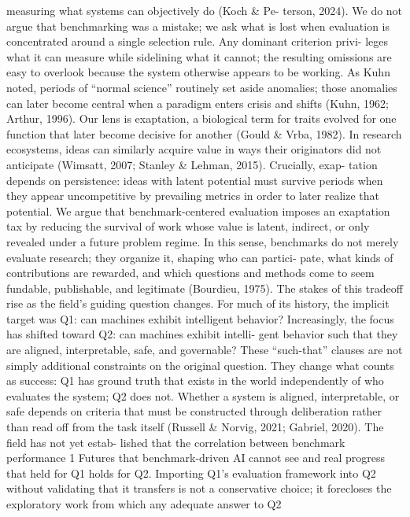 measuring what systems can objectively do (Koch \& Pe-
terson, 2024). We do not argue that benchmarking was a
mistake; we ask what is lost when evaluation is concentrated
around a single selection rule. Any dominant criterion privi-
leges what it can measure while sidelining what it cannot;
the resulting omissions are easy to overlook because the
system otherwise appears to be working. As Kuhn noted,
periods of “normal science” routinely set aside anomalies;
those anomalies can later become central when a paradigm
enters crisis and shifts (Kuhn, 1962; Arthur, 1996).
Our lens is exaptation, a biological term for traits evolved for
one function that later become decisive for another (Gould
\& Vrba, 1982). In research ecosystems, ideas can similarly
acquire value in ways their originators did not anticipate
(Wimsatt, 2007; Stanley \& Lehman, 2015). Crucially, exap-
tation depends on persistence: ideas with latent potential
must survive periods when they appear uncompetitive by
prevailing metrics in order to later realize that potential. We
argue that benchmark-centered evaluation imposes an
exaptation tax by reducing the survival of work whose
value is latent, indirect, or only revealed under a future
problem regime. In this sense, benchmarks do not merely
evaluate research; they organize it, shaping who can partici-
pate, what kinds of contributions are rewarded, and which
questions and methods come to seem fundable, publishable,
and legitimate (Bourdieu, 1975).
The stakes of this tradeoff rise as the field’s guiding question
changes. For much of its history, the implicit target was Q1:
can machines exhibit intelligent behavior? Increasingly, the
focus has shifted toward Q2: can machines exhibit intelli-
gent behavior such that they are aligned, interpretable, safe,
and governable? These “such-that” clauses are not simply
additional constraints on the original question. They change
what counts as success: Q1 has ground truth that exists in
the world independently of who evaluates the system; Q2
does not. Whether a system is aligned, interpretable, or
safe depends on criteria that must be constructed through
deliberation rather than read off from the task itself (Russell
\& Norvig, 2021; Gabriel, 2020). The field has not yet estab-
lished that the correlation between benchmark performance
1
Futures that benchmark-driven AI cannot see
and real progress that held for Q1 holds for Q2. Importing
Q1’s evaluation framework into Q2 without validating that
it transfers is not a conservative choice; it forecloses the
exploratory work from which any adequate answer to Q2
